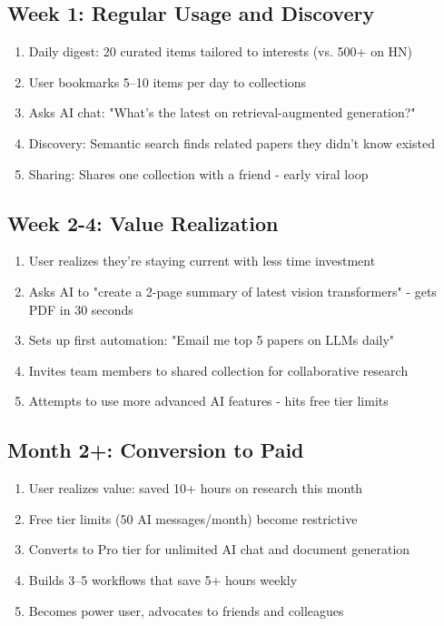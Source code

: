 \documentclass{report}
\begin{document}
\subsection{Week 1: Regular Usage and Discovery}

\begin{enumerate}
    \item Daily digest: 20 curated items tailored to interests (vs. 500+ on HN)
    \item User bookmarks 5--10 items per day to collections
    \item Asks AI chat: "What's the latest on retrieval-augmented generation?"
    \item Discovery: Semantic search finds related papers they didn't know existed
    \item Sharing: Shares one collection with a friend - early viral loop
\end{enumerate}

\subsection{Week 2-4: Value Realization}

\begin{enumerate}
    \item User realizes they're staying current with less time investment
    \item Asks AI to "create a 2-page summary of latest vision transformers" - gets PDF in 30 seconds
    \item Sets up first automation: "Email me top 5 papers on LLMs daily"
    \item Invites team members to shared collection for collaborative research
    \item Attempts to use more advanced AI features - hits free tier limits
\end{enumerate}

\subsection{Month 2+: Conversion to Paid}

\begin{enumerate}
    \item User realizes value: saved 10+ hours on research this month
    \item Free tier limits (50 AI messages/month) become restrictive
    \item Converts to Pro tier for unlimited AI chat and document generation
    \item Builds 3--5 workflows that save 5+ hours weekly
    \item Becomes power user, advocates to friends and colleagues
\end{enumerate}
\end{document}
